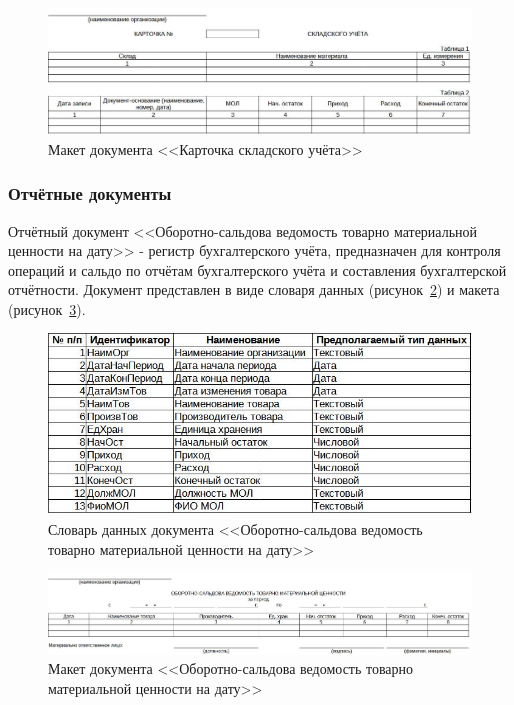 \documentclass[12pt, a4paper, simple]{eskdtext}
\begin{document}
    \begin{figure}[p!h]
        \centering
        \includegraphics[width=16cm]
            {_docs/ОД_КартСклУч_макет.jpg}
        \caption{Макет документа <<Карточка складского учёта>>}
        \label{fig:od_KartSklYch_maket}
    \end{figure}


    \newpage
    \subsubsection{Отчётные документы}

    Отчётный документ <<Оборотно-сальдова ведомость товарно материальной ценности на дату>>
    - регистр бухгалтерского учёта, предназначен для контроля операций
    и сальдо по отчётам бухгалтерского учёта и составления бухгалтерской отчётности.
    Документ представлен в виде словаря данных (рисунок~\ref{fig:OT_OborSaldVed_tipi})
    и макета (рисунок~\ref{fig:OT_OborSaldVed_maket}).

    \begin{figure}[!h]
        \centering
        \includegraphics[]
            {_docs/ОТ_ОборСальдВед_типы.jpg}
        \caption{Словарь данных документа <<Оборотно-сальдова ведомость товарно материальной ценности на дату>>}
        \label{fig:OT_OborSaldVed_tipi}
    \end{figure}

    \begin{figure}[!h]
        \centering
        \includegraphics[width=16cm]
            {_docs/ОТ_ОборСальдВед_макет.jpg}
        \caption{Макет документа <<Оборотно-сальдова ведомость товарно материальной ценности на дату>>}
        \label{fig:OT_OborSaldVed_maket}
    \end{figure}
\end{document}
